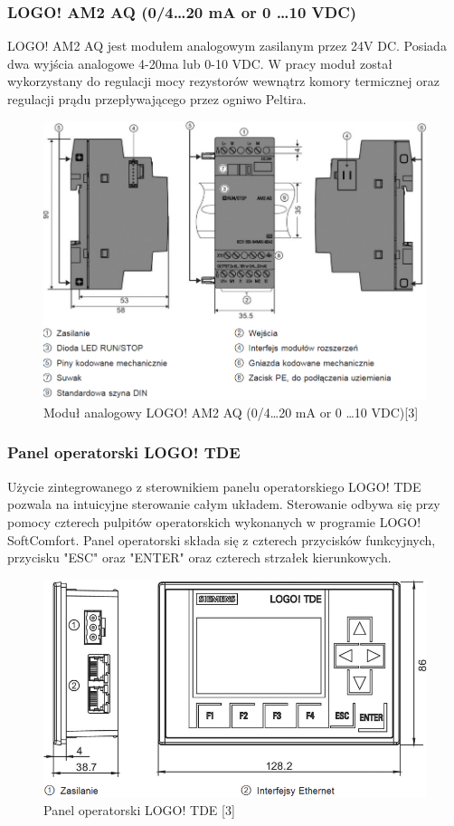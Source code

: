 \documentclass[oneside]{mgr}
\begin{document}
\subsubsection{LOGO! AM2 AQ (0/4\dots20 mA or 0 \dots 10 VDC)}
LOGO! AM2 AQ jest modułem analogowym zasilanym przez 24V DC. Posiada dwa wyjścia analogowe 4-20ma lub 0-10 VDC. W pracy moduł został wykorzystany do regulacji mocy rezystorów wewnątrz komory termicznej oraz regulacji prądu przepływającego przez ogniwo Peltira.

\begin{figure}
    \centering
    \includegraphics[width=\textwidth]{Modul_analogowy.PNG}
    \caption{Moduł analogowy LOGO! AM2 AQ (0/4\dots20 mA or 0 \dots 10 VDC)[3]}
\end{figure}

\subsubsection{Panel operatorski LOGO! TDE}

Użycie zintegrowanego z sterownikiem panelu operatorskiego LOGO! TDE pozwala na intuicyjne sterowanie całym układem. Sterowanie odbywa się przy pomocy czterech pulpitów operatorskich wykonanych w programie LOGO! SoftComfort. Panel operatorski składa się z czterech przycisków funkcyjnych, przycisku "ESC" oraz "ENTER" oraz czterech strzałek kierunkowych.

\begin{figure}
    \centering
    \includegraphics[width=\textwidth]{HMI.PNG}
    \caption{Panel operatorski LOGO! TDE [3]}
\end{figure}
\end{document}
